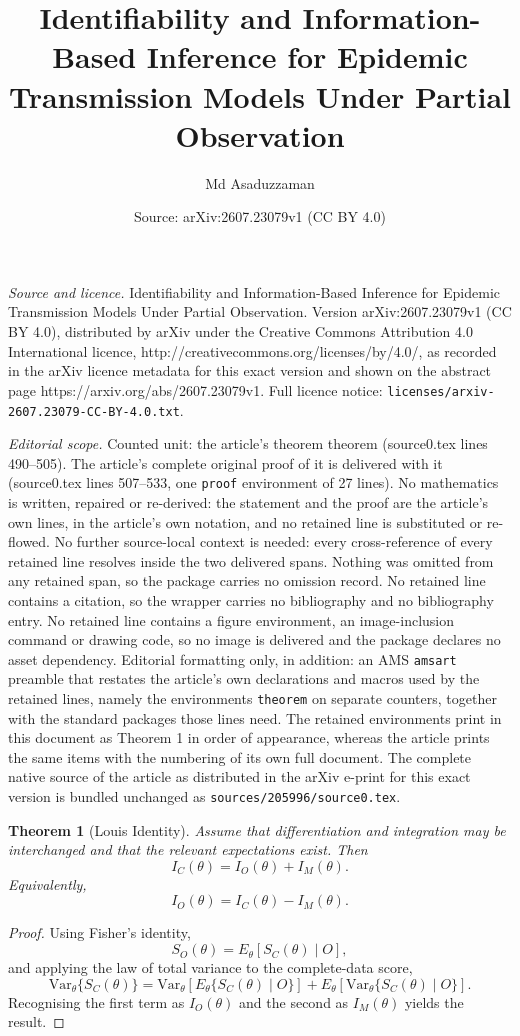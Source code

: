 \documentclass[10pt,a4paper]{amsart}
\title{\null\vspace{-3cm} \textsf{Identifiability and Information-Based Inference for Epidemic Transmission Models Under Partial Observation}}
\author{Md Asaduzzaman}
\date{Source: arXiv:2607.23079v1 (CC BY 4.0)}
\newtheorem{theorem}{Theorem}
\begin{document}
\maketitle

\noindent\emph{Source and licence.} \null\vspace{-3cm} \textsf{Identifiability and Information-Based Inference for Epidemic Transmission Models Under Partial Observation}. Version arXiv:2607.23079v1 (CC BY 4.0), distributed by arXiv under the Creative Commons Attribution 4.0 International licence, http://creativecommons.org/licenses/by/4.0/, as recorded in the arXiv licence metadata for this exact version and shown on the abstract page https://arxiv.org/abs/2607.23079v1. Full licence notice: \texttt{licenses/arxiv-2607.23079-CC-BY-4.0.txt}.\par\smallskip

\noindent\textit{Editorial scope.} Counted unit: the article's theorem theorem (source0.tex lines 490--505). The article's complete original proof of it is delivered with it (source0.tex lines 507--533, one \texttt{proof} environment of 27 lines). No mathematics is written, repaired or re-derived: the statement and the proof are the article's own lines, in the article's own notation, and no retained line is substituted or re-flowed.  No further source-local context is needed: every cross-reference of every retained line resolves inside the two delivered spans.  Nothing was omitted from any retained span, so the package carries no omission record.  No retained line contains a citation, so the wrapper carries no bibliography and no bibliography entry.  No retained line contains a figure environment, an image-inclusion command or drawing code, so no image is delivered and the package declares no asset dependency.  Editorial formatting only, in addition: an AMS \texttt{amsart} preamble that restates the article's own declarations and macros used by the retained lines, namely the environments \texttt{theorem} on separate counters, together with the standard packages those lines need.  The retained environments print in this document as Theorem 1 in order of appearance, whereas the article prints the same items with the numbering of its own full document.  The complete native source of the article as distributed in the arXiv e-print for this exact version is bundled unchanged as \texttt{sources/205996/source0.tex}.
\begin{theorem}[Louis Identity]
Assume that differentiation and integration may be interchanged and that the relevant expectations exist. Then
\[
I_C(\theta)
=
I_O(\theta)
+
I_M(\theta).
\]
Equivalently,
\[
I_O(\theta)
=
I_C(\theta)-I_M(\theta).
\]
\end{theorem}

\begin{proof}
Using Fisher's identity,
\[
S_O(\theta)
=
E_\theta
\left[
S_C(\theta)\mid O
\right],
\]
and applying the law of total variance to the complete-data score,
\[
\mathrm{Var}_\theta\{S_C(\theta)\}
=
\mathrm{Var}_\theta
\left[
E_\theta\{S_C(\theta)\mid O\}
\right]
+
E_\theta
\left[
\mathrm{Var}_\theta
\{S_C(\theta)\mid O\}
\right].
\]
Recognising the first term as $I_O(\theta)$ and the second as $I_M(\theta)$ yields the result.
\end{proof}
\end{document}
